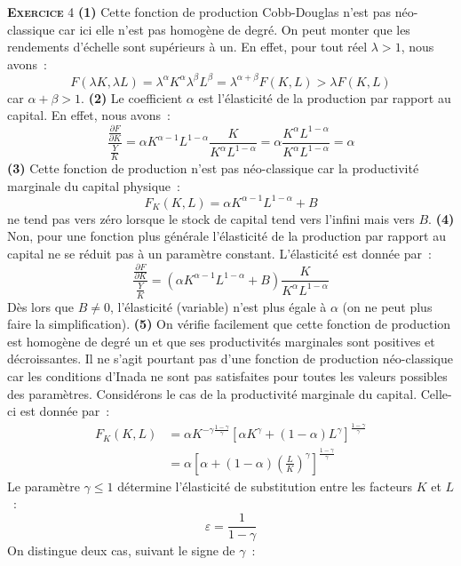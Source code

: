 \documentclass[10pt,a4paper,notitlepage]{report}
\newcommand{\exercice}[1]{\textsc{\textbf{Exercice}} #1}
\newcommand{\question}[1]{\textbf{(#1)}}
\begin{document}
\exercice{4}  \question{1} Cette  fonction de  production Cobb-Douglas
n'est pas néo-classique  car ici elle n'est pas homogène  de degré. On
peut monter  que les  rendements d'échelle sont  supérieurs à  un. En
effet, pour tout réel $\lambda>1$, nous avons :
\[
F(\lambda K, \lambda L) = \lambda^{\alpha}K^{\alpha}\lambda^{\beta}L^{\beta} = \lambda^{\alpha+\beta}F(K,L)>\lambda F(K,L)
\]
car  $\alpha+\beta>1$.   \question{2}  Le  coefficient   $\alpha$  est
l'élasticité de la  production par rapport au capital.  En effet, nous
avons :
\[
\frac{\frac{\partial F}{\partial K}}{\frac{Y}{K}} = \alpha K^{\alpha-1}L^{1-\alpha}\frac{K}{K^{\alpha}L^{1-\alpha}} = \alpha\frac{K^{\alpha}L^{1-\alpha}}{K^{\alpha}L^{1-\alpha}} = \alpha
\]
\question{3} Cette fonction de  production n'est pas néo-classique car
la productivité marginale du capital physique :
\[
F_K(K,L) = \alpha K^{\alpha-1}L^{1-\alpha} + B
\]  
ne tend pas  vers zéro lorsque le stock de  capital tend vers l'infini
mais  vers $B$.  \question{4}  Non, pour  une  fonction plus  générale
l'élasticité de la production par rapport  au capital ne se réduit pas
à un paramètre constant. L'élasticité est donnée par :
\[
\frac{\frac{\partial F}{\partial K}}{\frac{Y}{K}} = \left(\alpha K^{\alpha-1}L^{1-\alpha}+B\right)\frac{K}{K^{\alpha}L^{1-\alpha}}
\]
Dès lors  que $B\neq  0$, l'élasticité (variable)  n'est plus  égale à
$\alpha$ (on ne  peut plus faire la  simplification).  \question{5} On
vérifie facilement  que cette fonction  de production est  homogène de
degré  un  et  que  ses productivités  marginales  sont  positives  et
décroissantes. Il ne s'agit pourtant  pas d'une fonction de production
néo-classique car les conditions d'Inada  ne sont pas satisfaites pour
toutes les valeurs possibles des  paramètres. Considérons le cas de la
productivité marginale du capital. Celle-ci est donnée par :
\[
\begin{split}
F_K(K,L) &= \alpha K^{-\gamma\frac{1-\gamma}{\gamma}}\left[\alpha K^{\gamma} + (1-\alpha)L^{\gamma}\right]^{\frac{1-\gamma}{\gamma}}\\
&= \alpha \left[\alpha + (1-\alpha)\left(\frac{L}{K}\right)^{\gamma}\right]^{\frac{1-\gamma}{\gamma}}
\end{split}
\]
Le paramètre $\gamma\leq 1$ détermine l'élasticité de substitution entre les facteurs $K$ et $L$ : 
\[
\varepsilon = \frac{1}{1-\gamma} 
\]
On distingue deux cas, suivant le signe de $\gamma$ :
\end{document}
